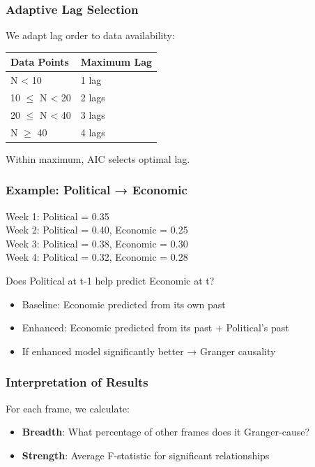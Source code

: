 \documentclass[11pt]{article}
\begin{document}
\subsubsection{Adaptive Lag Selection}

We adapt lag order to data availability:

\begin{center}
\begin{tabular}{ll}
\toprule
\textbf{Data Points} & \textbf{Maximum Lag} \\
\midrule
N < 10 & 1 lag \\
10 $\leq$ N < 20 & 2 lags \\
20 $\leq$ N < 40 & 3 lags \\
N $\geq$ 40 & 4 lags \\
\bottomrule
\end{tabular}
\end{center}

Within maximum, AIC selects optimal lag.

\subsubsection{Example: Political → Economic}

Week 1: Political = 0.35\\
Week 2: Political = 0.40, Economic = 0.25\\
Week 3: Political = 0.38, Economic = 0.30\\
Week 4: Political = 0.32, Economic = 0.28

Does Political at t-1 help predict Economic at t?
\begin{itemize}
    \item Baseline: Economic predicted from its own past
    \item Enhanced: Economic predicted from its past + Political's past
    \item If enhanced model significantly better → Granger causality
\end{itemize}

\subsubsection{Interpretation of Results}

For each frame, we calculate:
\begin{itemize}
    \item \textbf{Breadth}: What percentage of other frames does it Granger-cause?
    \item \textbf{Strength}: Average F-statistic for significant relationships
\end{itemize}
\end{document}
